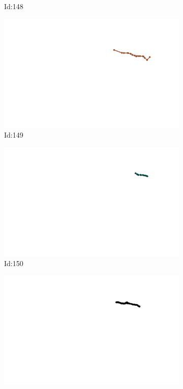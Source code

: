 \documentclass[12pt,twoside]{report}
\begin{document}
\begin{figure}
\begin{subfigure}[b]{0.20\textwidth}
\caption{Id:148}
\end{subfigure}
\begin{subfigure}[b]{0.20\textwidth}
\centering
\includegraphics[width=\textwidth]{../trajectories/149.png}
\caption{Id:149}
\end{subfigure}
\begin{subfigure}[b]{0.20\textwidth}
\centering
\includegraphics[width=\textwidth]{../trajectories/150.png}
\caption{Id:150}
\end{subfigure}
\begin{subfigure}[b]{0.20\textwidth}
\centering
\includegraphics[width=\textwidth]{../trajectories/161.png}

\end{subfigure}
\end{figure}
\end{document}
